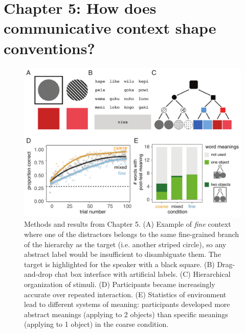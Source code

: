 \documentclass[11pt]{article}
\begin{document}
\vspace{1cm}

\section*{Chapter 5: How does communicative context shape conventions?}

\begin{figure}[t!]
\centering
\includegraphics[scale=0.8]{chapter5}
\caption{\small Methods and results from Chapter 5. (A) Example of \emph{fine} context where one of the distractors belongs to the same fine-grained branch of the hierarchy as the target (i.e. another striped circle), so any abstract label would be insufficient to disambiguate them. The target is highlighted for the speaker with a black square. (B) Drag-and-drop chat box interface with artificial labels. (C) Hierarchical organization of stimuli. (D) Participants became increasingly accurate over repeated interaction. (E) Statistics of environment lead to different systems of meaning: participants developed more abstract meanings (applying to 2 objects) than specific meanings (applying to 1 object) in the coarse condition.}
\label{fig:chapter5}
\end{figure}
\end{document}

